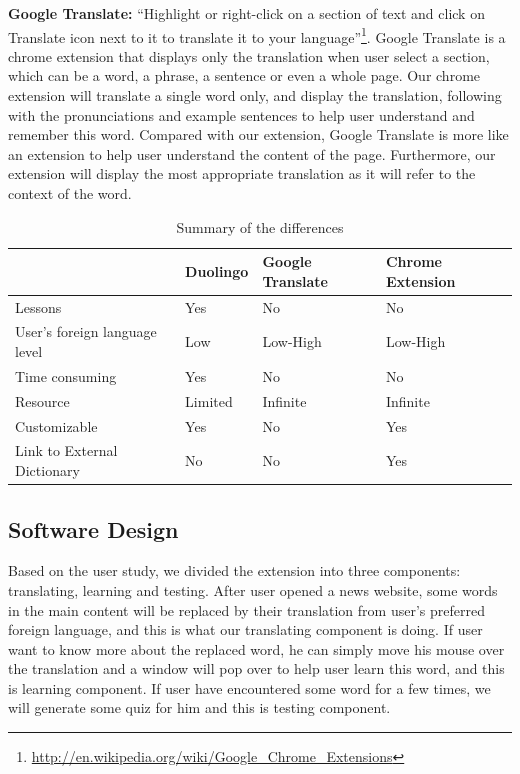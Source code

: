 \textbf{Google Translate:} ``Highlight or right-click on a section of text and click
on Translate icon next to it to translate it to your 
language''\footnote{\url{http://en.wikipedia.org/wiki/Google_Chrome_Extensions}}. 
Google Translate is a chrome extension that displays only the translation when user 
select a section, which can be a word, a phrase, a sentence or even a whole page. 
Our chrome extension will translate a single word only, and display the translation,
following with the pronunciations and example sentences to help user understand and 
remember this word. Compared with our extension, Google Translate is more like an extension 
to help user understand the content of the page. Furthermore, our extension will display 
the most appropriate translation as it will refer to the context of the word.
\begin{table}[ht]
  \caption{Summary of the differences}
  \label{table:difference_summary}
  \begin{center}
  \begin{tabular}{| p{2.4cm} | p{1.2cm} | p{1.2cm} |  p{1.2cm} |}
    \hline
    & Duolingo & Google Translate & Chrome Extension \\
    \hline
    Lessons & Yes & No & No \\
    \hline
    User's foreign language level & Low & Low-High & Low-High \\
    \hline
    Time consuming & Yes & No & No\\
    \hline
    Resource & Limited & Infinite & Infinite \\
    \hline
    Customizable & Yes & No & Yes \\
    \hline
    Link to External Dictionary & No & No & Yes \\
    \hline
  \end{tabular}
  \end{center}
\end{table}
\subsection{Software Design}
Based on the user study, we divided the extension into three components: translating, learning and testing. After user opened a news website, 
some words in the main content will be replaced by their translation from user's preferred foreign language, and this is what our translating 
component is doing. If user want to know more about the replaced word, he can simply move his mouse over the translation and a window will pop 
over to help user learn this word, and this is learning component. If user have encountered some word for a few times, we will generate some 
quiz for him and this is testing component.
